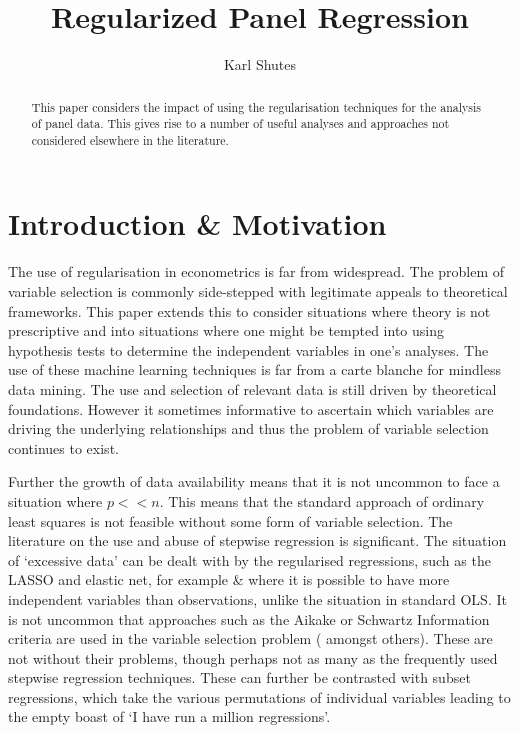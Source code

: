 \documentclass[11pt]{article}
\title{Regularized Panel Regression}
\author{Karl Shutes}
\begin{document}
\maketitle
\begin{abstract}
{This paper considers the impact of using the regularisation techniques for the analysis of panel data. This gives rise to a number of useful analyses and approaches not considered elsewhere in the literature.}
\end{abstract}

\section{Introduction \& Motivation}
The use of regularisation in econometrics is far from widespread. The problem of variable selection is commonly side-stepped with legitimate appeals to theoretical frameworks. This paper extends this to consider situations where theory is not prescriptive and into situations where one might be tempted into using hypothesis tests to determine the independent variables in one's analyses. The use of these machine learning techniques is far from a carte blanche for mindless data mining. The use and selection of relevant data is still driven by theoretical foundations. However it sometimes informative to ascertain which variables are driving the underlying relationships and thus the problem  of variable selection continues to exist. 

Further the growth of data availability means that it is not uncommon to face a situation where $p<<n$. This means that the standard approach of ordinary least squares is not feasible without some form of variable selection. The literature on the use and abuse of stepwise regression is significant. The situation of `excessive data' can be dealt with by the regularised regressions, such as the LASSO and elastic net, for example  \cite{Hastie} \& \cite{zouphd} where it is possible to have more independent variables than observations, unlike the situation in standard OLS. It is not uncommon that approaches such as the Aikake or Schwartz Information criteria are used in the variable selection problem (\cite{aic} amongst others). These are not without their problems, though perhaps not as many as the frequently used stepwise regression techniques. These can further be contrasted with subset regressions, which take the various permutations of individual variables leading to the empty boast of `I have run a million regressions'.
\end{document}

